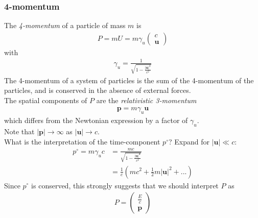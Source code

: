 \documentclass[a4paper]{article}
\begin{document}
\subsubsection{4-momentum}
The \emph{4-momentum} of a particle of mass $m$ is
\begin{equation*}
\begin{aligned}
P=mU=m\gamma_u \left(
\begin{array}{ll}
c\\
\mathbf{u}
\end{array}\right)
\end{aligned}
\end{equation*}
with
\begin{equation*}
\begin{aligned}
\gamma_u = \frac{1}{\sqrt{1-\frac{|\mathbf{u}|^2}{c^2}}}
\end{aligned}
\end{equation*}
The 4-momentum of a system of particles is the sum of the 4-momentum of the particles, and is conserved in the absence of external forces.\\
The spatial components of $P$ are the \emph{relativistic 3-momentum}
\begin{equation*}
\begin{aligned}
\mathbf{p} = m\gamma_u\mathbf{u}
\end{aligned}
\end{equation*}
which differs from the Newtonian expression by a factor of $\gamma_u$.\\
Note that $|\mathbf{p}| \to \infty$ as $|\mathbf{u}| \to c$.\\
What is the interpretation of the time-component $p^\circ$? Expand for $|\mathbf{u}| \ll c$:
\begin{equation*}
\begin{aligned}
p^\circ = m\gamma_u c &= \frac{mc}{\sqrt{1-\frac{|\mathbf{u|^2}}{c^2}}}\\
&=\frac{1}{c}\left(mc^2+\frac{1}{2}m|\mathbf{u}|^2+...\right)
\end{aligned}
\end{equation*}
Since $p^\circ$ is conserved, this strongly suggests that we should interpret $P$ as
\begin{equation*}
\begin{aligned}
P = \left(
\begin{array}{ll}
\frac{E}{c}\\
\mathbf{p}
\end{array}\right)
\end{aligned}
\end{equation*}
\end{document}
